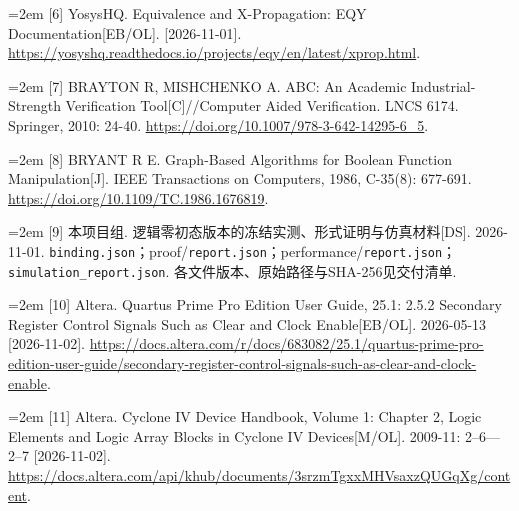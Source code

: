 \documentclass[UTF8,fontset=fandol,12pt]{ctexart}
\begin{document}
\begin{samepage}
{\fontsize{10.5}{15.75}\selectfont
\noindent\hangindent=2em [6] YosysHQ. Equivalence and X-Propagation: EQY Documentation[EB/\allowbreak{}OL]. [2026-11-01]. \url{https://yosyshq.readthedocs.io/projects/eqy/en/latest/xprop.html}.
\par
}
\end{samepage}
\begin{samepage}
{\fontsize{10.5}{15.75}\selectfont
\noindent\hangindent=2em [7] BRAYTON R, MISHCHENKO A. ABC: An Academic Industrial-Strength Verification Tool[C]/\allowbreak{}/\allowbreak{}Computer Aided Verification. LNCS 6174. Springer, 2010: 24-40. \url{https://doi.org/10.1007/978-3-642-14295-6_5}.
\par
}
\end{samepage}
\begin{samepage}
{\fontsize{10.5}{15.75}\selectfont
\noindent\hangindent=2em [8] BRYANT R E. Graph-Based Algorithms for Boolean Function Manipulation[J]. IEEE Transactions on Computers, 1986, C-35(8): 677-691. \url{https://doi.org/10.1109/TC.1986.1676819}.
\par
}
\end{samepage}
\begin{samepage}
{\fontsize{10.5}{15.75}\selectfont
\noindent\hangindent=2em [9] 本项目组. 逻辑零初态版本的冻结实测、形式证明与仿真材料[DS]. 2026-11-01. \texttt{binding.\allowbreak{}json}；proof/\allowbreak{}\texttt{report.\allowbreak{}json}；performance/\allowbreak{}\texttt{report.\allowbreak{}json}；\texttt{simulation\_\allowbreak{}report.\allowbreak{}json}. 各文件版本、原始路径与SHA-256见交付清单.
\par
}
\end{samepage}
\begin{samepage}
{\fontsize{10.5}{15.75}\selectfont
\noindent\hangindent=2em [10] Altera. Quartus Prime Pro Edition User Guide, 25.1: 2.5.2 Secondary Register Control Signals Such as Clear and Clock Enable[EB/\allowbreak{}OL]. 2026-05-13 [2026-11-02]. \url{https://docs.altera.com/r/docs/683082/25.1/quartus-prime-pro-edition-user-guide/secondary-register-control-signals-such-as-clear-and-clock-enable}.
\par
}
\end{samepage}
\begin{samepage}
{\fontsize{10.5}{15.75}\selectfont
\noindent\hangindent=2em [11] Altera. Cyclone IV Device Handbook, Volume 1: Chapter 2, Logic Elements and Logic Array Blocks in Cyclone IV Devices[M/\allowbreak{}OL]. 2009-11: 2–6—2–7 [2026-11-02]. \url{https://docs.altera.com/api/khub/documents/3srzmTgxxMHVsaxzQUGqXg/content}.
\par
}
\end{samepage}
\end{document}
